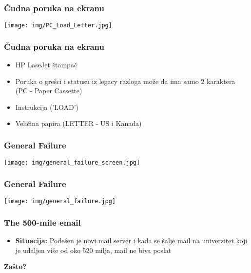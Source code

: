 \documentclass{beamer}
\begin{document}
\begin{frame}
    \frametitle{Čudna poruka na ekranu}

    \begin{center}
        \texttt{[image: img/PC\_Load\_Letter.jpg]}
    \end{center}
    

\end{frame}

\begin{frame}
    \frametitle{Čudna poruka na ekranu}
    \begin{itemize}
        \item HP LaseJet štampač \newline
        \item Poruka o grešci i statusu iz legacy razloga može da ima samo 2 karaktera (PC - Paper Cassette)\newline 
        \item Instrukcija ('LOAD') \newline
        \item Veličina papira (LETTER - US i Kanada)
    \end{itemize}
\end{frame}

\begin{frame}
    \frametitle{General Failure}
    \begin{center}
        \texttt{[image: img/general\_failure\_screen.jpg]}
    \end{center}
\end{frame}

\begin{frame}
    \frametitle{General Failure}
    \begin{center}
        \texttt{[image: img/general\_failure.jpg]}
    \end{center}
\end{frame}

\begin{frame}
    \frametitle{The 500-mile email}
    \begin{itemize}
        \item \textbf{Situacija:} Podešen je novi mail server i kada se šalje mail na univerzitet koji je udaljen više od oko 520 milja, mail ne biva poslat
    \end{itemize}
    \vspace{1cm}
    \begin{center}
        \LARGE \textbf{Zašto?}
    \end{center}
\end{frame}
\end{document}
